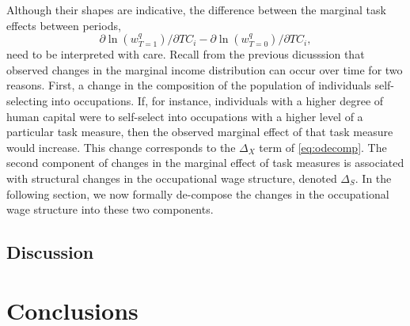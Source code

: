 
Although their shapes are indicative, the difference between the marginal task effects between periods,
$$\partial\ln(w^q_{T=1})/\partial TC_i-\partial\ln(w^q_{T=0})/\partial TC_i,$$
need to be interpreted with care. Recall from the previous dicusssion that observed changes in the marginal income distribution can occur over time for two reasons. First, a change in the composition of the population of individuals self-selecting into occupations. If, for instance, individuals with a higher degree of human capital were to self-select into occupations with a higher level of a particular task measure, then the observed marginal effect of that task measure would increase. This change corresponds to the $\Delta_X$ term of \eqref{eq:odecomp}. The second component of changes in the marginal effect of task measures is associated with structural changes in the occupational wage structure, denoted $\Delta_S$. In the following section, we now formally de-compose the changes in the occupational wage structure into these two components.


\subsection{Discussion}



\section{Conclusions}

